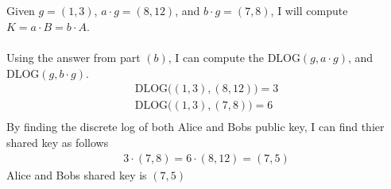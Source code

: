 \documentclass{article}
\begin{document}
\subsection{}
Given $g = (1,3)$, $a \cdot g = (8, 12)$, and $b \cdot g = (7, 8)$, I will compute
$K = a\cdot B = b \cdot A$.
\\
\\
Using the answer from part $(b)$, I can compute the 
$\textrm{DLOG}(g, a\cdot g)$, and 
$\textrm{DLOG}(g, b\cdot g)$.
\[
\begin{split}
\textrm{DLOG}\big((1,3), (8, 12)\big) = 3 \\
\textrm{DLOG}\big((1,3), (7, 8)\big) = 6 \\
\end{split}
\]
By finding the discrete log of both Alice and Bobs public key,
I can find thier shared key as follows
\[
\begin{split}
3 \cdot (7, 8) = 6 \cdot (8, 12) = (7, 5)
\end{split}
\]
Alice and Bobs shared key is $(7, 5)$
\end{document}
